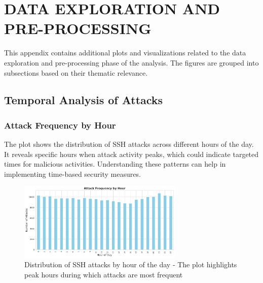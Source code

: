 
\vspace{-0.5cm}

\section{DATA EXPLORATION AND PRE-PROCESSING}


    This appendix contains additional plots and visualizations related to the data exploration and pre-processing phase of the analysis. The figures are grouped into subsections based on their thematic relevance.

    \subsection{Temporal Analysis of Attacks}


        \subsubsection{Attack Frequency by Hour \\}
        
            The plot shows the distribution of SSH attacks across different hours of the day. It reveals specific hours when attack activity peaks, which could indicate targeted times for malicious activities. Understanding these patterns can help in implementing time-based security measures.
            
            \vspace{-0.1cm}

            \begin{figure}[H]
                \centering
                \includegraphics[width=0.7\textwidth]{../figures/plots/section1/attack_frequency_by_hour.png}
                \caption{Distribution of SSH attacks by hour of the day - The plot highlights peak hours during which attacks are most frequent}
                \label{fig:attack_frequency_by_hour}
            \end{figure}
        
